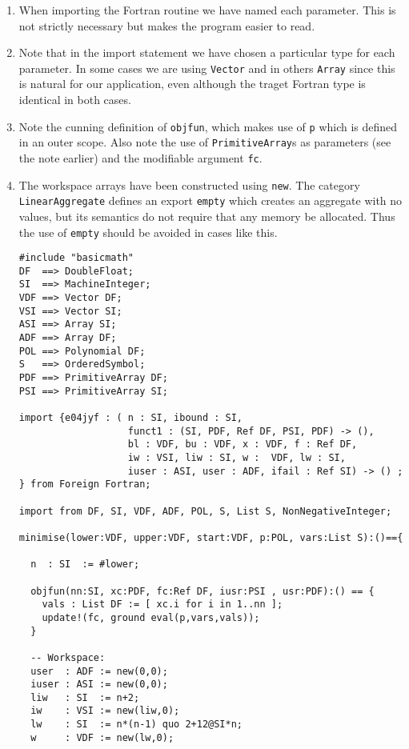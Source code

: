 \begin{enumerate}
\item When importing the Fortran routine we have named each parameter.
This is not strictly necessary but makes the program easier to read.
\item Note that in the import statement we have chosen a particular
\asharp{} type for each parameter.  In some cases we are using {\tt Vector}
and in others {\tt Array} since this is natural for our application, even
although the traget Fortran type is identical in both cases.
\item Note the cunning definition of {\tt objfun}, which makes use of
{\tt p} which is defined in an outer scope.  Also note the use of
{\tt Primitive\-Array}s as parameters (see the note earlier) and the
modifiable argument {\tt fc}.
\item The workspace arrays have been constructed using {\tt new}.  The
category {\tt Linear\-Aggregate} defines an export {\tt empty} which
creates an aggregate with no values, but its semantics do not require
that any memory be allocated.  Thus the use of {\tt empty} should be
avoided in cases like this.

\newpage
\begin{small}
\begin{verbatim}
#include "basicmath"
DF  ==> DoubleFloat;
SI  ==> MachineInteger;
VDF ==> Vector DF;
VSI ==> Vector SI;
ASI ==> Array SI;
ADF ==> Array DF;
POL ==> Polynomial DF;
S   ==> OrderedSymbol;
PDF ==> PrimitiveArray DF;
PSI ==> PrimitiveArray SI;

import {e04jyf : ( n : SI, ibound : SI,
                   funct1 : (SI, PDF, Ref DF, PSI, PDF) -> (),
                   bl : VDF, bu : VDF, x : VDF, f : Ref DF,
                   iw : VSI, liw : SI, w :  VDF, lw : SI,
                   iuser : ASI, user : ADF, ifail : Ref SI) -> () ;
} from Foreign Fortran;

import from DF, SI, VDF, ADF, POL, S, List S, NonNegativeInteger;

minimise(lower:VDF, upper:VDF, start:VDF, p:POL, vars:List S):()=={

  n  : SI  := #lower;

  objfun(nn:SI, xc:PDF, fc:Ref DF, iusr:PSI , usr:PDF):() == {
    vals : List DF := [ xc.i for i in 1..nn ];
    update!(fc, ground eval(p,vars,vals));
  }

  -- Workspace:
  user  : ADF := new(0,0);
  iuser : ASI := new(0,0);
  liw   : SI  := n+2;
  iw    : VSI := new(liw,0);
  lw    : SI  := n*(n-1) quo 2+12@SI*n;
  w     : VDF := new(lw,0);


\end{verbatim}
\end{small}
\end{enumerate}
